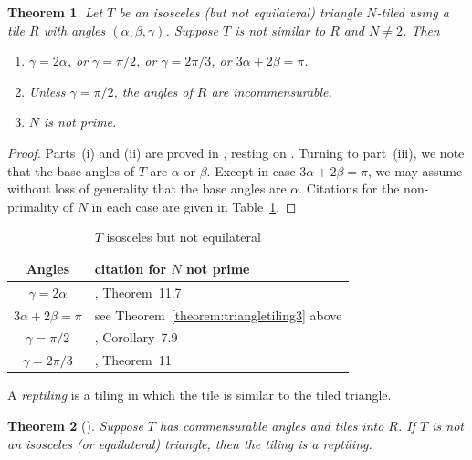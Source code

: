 \documentclass{amsart}
\theoremstyle{plain}
\newtheorem{theorem}{Theorem}
\theoremstyle{definition}
\theoremstyle{remark}
\begin{document}
\begin{theorem} \label{theorem:isosceles}  Let $T$ be an isosceles (but not equilateral) triangle $N$-tiled
using a tile $R$ with angles $(\alpha,\beta,\gamma)$. Suppose $T$ is not similar to $R$ and $N \neq 2$. Then
\begin{enumerate}[{\rm (i)}]
\item $\gamma = 2\alpha$, or $\gamma = \pi/2$, or $\gamma = 2\pi/3$, or $3\alpha + 2\beta = \pi$.
\item Unless $\gamma = \pi/2$, the angles of $R$ are incommensurable.
\item $N$ is not prime.
\end{enumerate}
\end{theorem}

\begin{proof}
Parts~(i) and (ii) are proved in \cite{beeson-equilateral}, resting on \cite{laczkovich1995}.
Turning to part~(iii), we note that the base angles of $T$ are $\alpha$ or $\beta$.  Except
in case $3\alpha+2\beta = \pi$, we may assume without loss of generality that the base
angles are $\alpha$.  Citations for the non-primality of $N$ in each case are 
given in Table~\ref{table:isosceles}. 
\end{proof}
\begin{table}[ht]
\caption{$T$ isosceles but not equilateral}
\begin{center}
\begin{tabular}{c l}
Angles &  citation for $N$ not prime\\
\hline
$\gamma = 2 \alpha$  & \cite{beeson-isosceles}, Theorem~11.7  \\
$3\alpha +2\beta = \pi$ &  see Theorem~\ref{theorem:triangletiling3} above\\
$\gamma = \pi/2$   &  \cite{beeson-isosceles}, Corollary~7.9 \\
$\gamma = 2\pi/3$  &  \cite{beeson-isoscelesPrime}, Theorem~11
\end{tabular}
\end{center}
\label{table:isosceles}
\end{table}%


A {\em reptiling} is a tiling in which the tile is similar to the tiled triangle.
\begin{theorem}[\cite{laczkovich1995,laczkovich2012}]
   \label{theorem:l1995-5.3} Suppose $T$ has commensurable angles and tiles into $R$.  If $T$ is not an isosceles (or equilateral) triangle, then the tiling is a reptiling.
\end{theorem}
\end{document}
